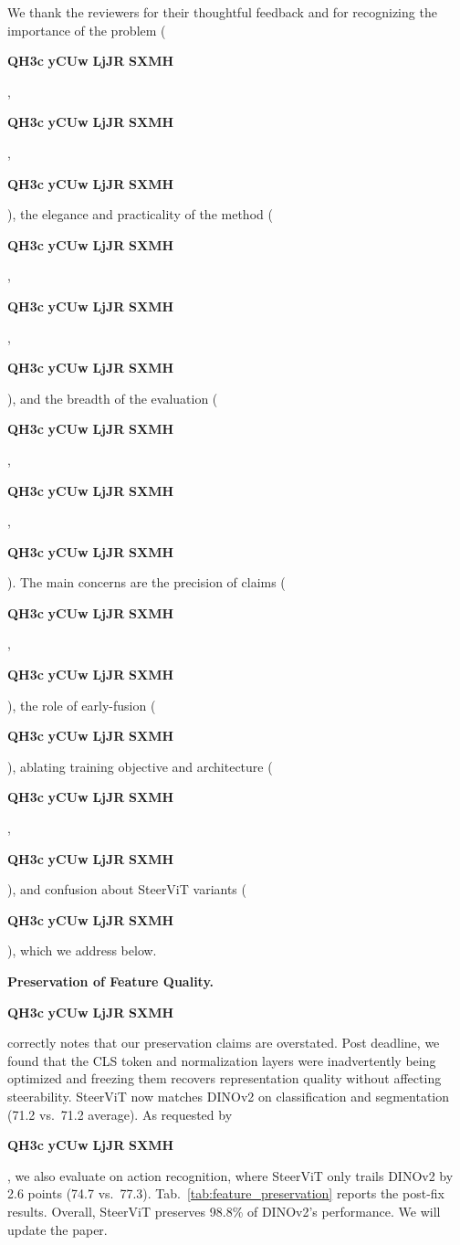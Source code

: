 \documentclass[10pt,twocolumn,letterpaper]{article}
\renewcommand{\paragraph}[1]{\vspace{1mm}\noindent\textbf{#1}}
\newcommand{\reviewertag}[2]{%
  \textcolor{#1}{\textbf{#2}}%
}
\DeclareRobustCommand{\R}[1]{%
  \ifcase#1\relax
    \PackageError{reviewers}{Reviewer number must be 1--4}{}%
  \or
    \reviewertag{revone}{QH3c}%
  \or
    \reviewertag{revtwo}{yCUw}%
  \or
    \reviewertag{revthree}{LjJR}%
  \or
    \reviewertag{revfour}{SXMH}%
  \else
    \PackageError{reviewers}{Reviewer number must be 1--4}{}%
  \fi
}
\begin{document}

\thispagestyle{empty}
\appendix


\noindent
We thank the reviewers for their thoughtful feedback and for recognizing the importance of the problem (\R1, \R3, \R4), the elegance and practicality of the method (\R1, \R2, \R4), and the breadth of the evaluation (\R1, \R2, \R3).
The main concerns are the precision of claims (\R1, \R4), the role of early-fusion (\R3), ablating training objective and architecture (\R1, \R4), and confusion about SteerViT variants (\R2), which we address below.


\paragraph{Preservation of Feature Quality.} \R4 correctly notes that our preservation claims are overstated. Post deadline, we found that the CLS token and normalization layers were inadvertently being optimized and freezing them recovers representation quality without affecting steerability. SteerViT now matches DINOv2 on classification and segmentation (71.2 vs.\ 71.2 average). As requested by \R2, we also evaluate on action recognition, where SteerViT only trails DINOv2 by 2.6 points (74.7 vs.\ 77.3). Tab.~\ref{tab:feature_preservation} reports the post-fix results. Overall, SteerViT preserves 98.8\% of DINOv2's performance. We will update the paper.
\end{document}
